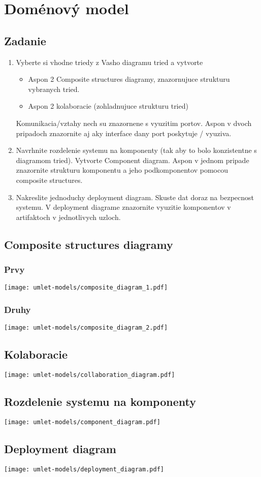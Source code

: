 \section{Doménový model}

\subsection{Zadanie}
\begin{enumerate} 
\item Vyberte si vhodne triedy z Vasho diagramu tried a vytvorte 
\begin{itemize}
\item Aspon 2 Composite structures diagramy, znazornujuce strukturu vybranych tried. 
\item Aspon 2 kolaboracie (zohladnujuce strukturu tried)
\end{itemize} 
Komunikacia/vztahy nech su znazornene s vyuzitim portov. Aspon v dvoch pripadoch znazornite aj aky interface dany port poskytuje / vyuziva. 

\item Navrhnite rozdelenie systemu na komponenty (tak aby to bolo konzistentne s diagramom tried). Vytvorte Component diagram. Aspon v jednom pripade znazornite strukturu komponentu a jeho podkomponentov pomocou composite structures.  

\item Nakreslite jednoduchy deployment diagram. Skuste dat doraz na bezpecnost systemu. V deployment diagrame znazornite vyuzitie komponentov v artifaktoch v jednotlivych uzloch. 
\end{enumerate} 

\clearpage 
\subsection{Composite structures diagramy}
\subsubsection{Prvy}
\texttt{[image: umlet-models/composite\_diagram\_1.pdf]}
\subsubsection{Druhy}
\texttt{[image: umlet-models/composite\_diagram\_2.pdf]}

\clearpage 
\subsection{Kolaboracie} 
\texttt{[image: umlet-models/collaboration\_diagram.pdf]}

\clearpage 
\subsection{Rozdelenie systemu na komponenty} 
\texttt{[image: umlet-models/component\_diagram.pdf]}

\clearpage 
\subsection{Deployment diagram} 
\texttt{[image: umlet-models/deployment\_diagram.pdf]}

